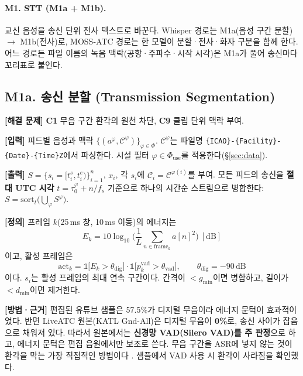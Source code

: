 \documentclass[10pt,a4paper]{article}
\newcommand{\Ctx}{\mathcal{C}}
\newcommand{\cmd}[1]{\textsf{\small #1}}
\newcommand{\ch}[1]{\textbf{\textcolor{red!60!black}{#1}}}
\begin{document}
\paragraph{M1. STT (M1a + M1b).} 교신 음성을 송신 단위 전사 텍스트로 바꾼다. Whisper 경로는 M1a(음성 구간 분할) $\to$ M1b(전사)로, MOSS-ATC 경로는 한 모델이 분할·전사·화자 구분을 함께 한다. 어느 경로든 파일 이름의 녹음 맥락(공항·주파수·시작 시각)은 M1a가 풀어 송신마다 꼬리표로 붙인다.

\subsection{M1a. 송신 분할 (Transmission Segmentation)}
\textbf{[해결 문제]} \ch{C1} 무음 구간 환각의 원천 차단, \ch{C9} 클립 단위 맥락 부여.

\textbf{[입력]} 피드별 음성과 맥락 $\{(a^{\varphi},\Ctx^{\varphi})\}_{\varphi\in\Phi}$. $\Ctx^{\varphi}$는 파일명 \texttt{\{ICAO\}-\{Facility\}-\{Date\}-\{Time\}Z}에서 파싱한다. 시설 필터 $\varphi\in\Phi_{\mathrm{use}}$를 적용한다(\S\ref{sec:data}).

\textbf{[출력]} $S = \{s_i = [t^s_i, t^e_i)\}_{i=1}^{n}$, $x_i$, 각 $s_i$에 $\Ctx_i=\Ctx^{\varphi(i)}$를 부여. 모든 피드의 송신을 \textbf{절대 UTC 시각} $t = \tau_0^{\varphi} + n/f_s$ 기준으로 하나의 시간순 스트림으로 병합한다: $S=\mathrm{sort}_t\big(\bigcup_{\varphi} S^{\varphi}\big)$.

\textbf{[정의]} 프레임 $k$(25\,ms 창, 10\,ms 이동)의 에너지는
\begin{equation}
E_k = 10\log_{10}\Big(\frac{1}{L}\sum_{n\in\mathrm{frame}_k} a[n]^2\Big)\ [\mathrm{dB}]
\end{equation}
이고, 활성 프레임은
\begin{equation}
\mathrm{act}_k = \mathbb{1}\big[E_k > \theta_{\mathrm{dig}}\big]\cdot \mathbb{1}\big[p^{\mathrm{vad}}_k > \theta_{\mathrm{vad}}\big],\qquad \theta_{\mathrm{dig}}=-90\,\mathrm{dB}
\end{equation}
이다. $s_i$는 활성 프레임의 최대 연속 구간이다. 간격이 $< g_{\min}$이면 병합하고, 길이가 $< d_{\min}$이면 제거한다.

\textbf{[방법·근거]} 편집된 유튜브 샘플은 57.5\%가 디지털 무음이라 에너지 문턱이 효과적이었다. 반면 LiveATC 원본(KATL \cmd{Gnd-All})은 디지털 무음이 \textbf{0\%}로, 송신 사이가 잡음으로 채워져 있다. 따라서 원본에서는 \textbf{신경망 VAD(Silero VAD)를 주 판정}으로 하고, 에너지 문턱은 편집 음원에서만 보조로 쓴다. 무음 구간을 ASR에 넣지 않는 것이 환각을 막는 가장 직접적인 방법이다 \cite{koenecke2024}. 샘플에서 VAD 사용 시 환각이 사라짐을 확인했다.
\end{document}

